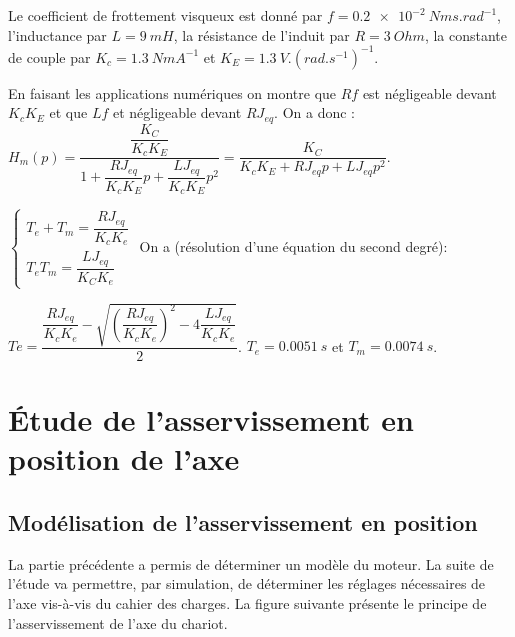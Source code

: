 Le coefficient de frottement visqueux est donné par $f = \SI{0,2e-2}{Nms.rad^{-1}}$, l'inductance par $L=\SI{9}{mH}$, la résistance de l'induit par $R=\SI{3}{Ohm}$, la constante de couple par $K_c = \SI{1,3}{NmA^{-1}}$ et $K_E = \SI{1,3}{V.(rad.s^{-1})^{-1}}$.

\ifprof
\begin{corrige}
En faisant les applications numériques on montre que $Rf$ est négligeable devant $K_c K_E$ et que $Lf$ et négligeable devant $RJ_{eq}$. On a donc : 
$H_m (p)=\dfrac{\dfrac{K_C}{K_c K_E}}{1+\dfrac{RJ_{eq}}{K_c K_E }p+\dfrac{LJ_{eq}}{K_c K_E }p^2 }=\dfrac{K_C}{K_c K_E+RJ_{eq} p+LJ_{eq} p^2 }$.

\end{corrige}
\else
\fi

\ifprof
\begin{corrige}
$
\left\{
\begin{array}{l}
T_e+T_m= \dfrac{RJ_{eq}}{K_c K_e}\\
T_e T_m=\dfrac{LJ_{eq}}{K_C K_e}
\end{array}
\right.
$
On a (résolution d’une équation du second degré):

$Te=\dfrac{\dfrac{RJ_{eq}}{K_c K_e}-\sqrt{\left(\dfrac{RJ_{eq}}{K_c K_e}\right)^2 - 4\dfrac{LJ_{eq}}{K_c K_e}}}{2}$. $T_e=\SI{0,0051}{s}$ et $T_m=\SI{0,0074}{s}$.


\end{corrige}
\else
\fi
\section*{Étude de l'asservissement en position de l'axe}
\subsection*{Modélisation de l'asservissement en position}
\ifprof
\else


La partie précédente a permis de déterminer un modèle du moteur. La suite de l'étude va permettre, par simulation, de déterminer les réglages nécessaires de l'axe vis-à-vis du cahier des charges. La figure suivante présente le principe de l'asservissement de l'axe du chariot.
 
